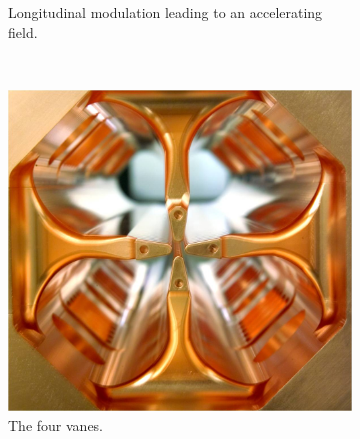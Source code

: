 \begin{figure}[!ht]
\begin{subfigure}[t]{0.3\textwidth}
		\caption{Longitudinal modulation leading to an accelerating field.}
		\label{}
	\end{subfigure}
	~
	\begin{subfigure}[t]{0.3\textwidth}
		\includegraphics[width=\textwidth]{02_BeamDiag/figures/fig000_RFQ_c}
		\caption{The four vanes.}
		\label{}
	\end{subfigure}
	\caption[]{}
	\label{chap2:fig:RFQ}
\end{figure}
